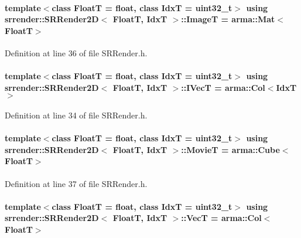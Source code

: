 \paragraph[{\texorpdfstring{ImageT}{ImageT}}]{\setlength{\rightskip}{0pt plus 5cm}template$<$class FloatT  = float, class IdxT  = uint32\+\_\+t$>$ using {\bf srrender\+::\+S\+R\+Render2D}$<$ FloatT, IdxT $>$\+::{\bf ImageT} =  arma\+::\+Mat$<$FloatT$>$}\hypertarget{classsrrender_1_1SRRender2D_a84ba69a439ee39a97bb8fed4eebac011}{}\label{classsrrender_1_1SRRender2D_a84ba69a439ee39a97bb8fed4eebac011}


Definition at line 36 of file S\+R\+Render.\+h.

\paragraph[{\texorpdfstring{I\+VecT}{IVecT}}]{\setlength{\rightskip}{0pt plus 5cm}template$<$class FloatT  = float, class IdxT  = uint32\+\_\+t$>$ using {\bf srrender\+::\+S\+R\+Render2D}$<$ FloatT, IdxT $>$\+::{\bf I\+VecT} =  arma\+::\+Col$<$IdxT$>$}\hypertarget{classsrrender_1_1SRRender2D_abf2e65ab6bcf77af73d3988cc3d457b9}{}\label{classsrrender_1_1SRRender2D_abf2e65ab6bcf77af73d3988cc3d457b9}


Definition at line 34 of file S\+R\+Render.\+h.

\paragraph[{\texorpdfstring{MovieT}{MovieT}}]{\setlength{\rightskip}{0pt plus 5cm}template$<$class FloatT  = float, class IdxT  = uint32\+\_\+t$>$ using {\bf srrender\+::\+S\+R\+Render2D}$<$ FloatT, IdxT $>$\+::{\bf MovieT} =  arma\+::\+Cube$<$FloatT$>$}\hypertarget{classsrrender_1_1SRRender2D_a884febde0e56f7e07fd470f2498eadbd}{}\label{classsrrender_1_1SRRender2D_a884febde0e56f7e07fd470f2498eadbd}


Definition at line 37 of file S\+R\+Render.\+h.

\paragraph[{\texorpdfstring{VecT}{VecT}}]{\setlength{\rightskip}{0pt plus 5cm}template$<$class FloatT  = float, class IdxT  = uint32\+\_\+t$>$ using {\bf srrender\+::\+S\+R\+Render2D}$<$ FloatT, IdxT $>$\+::{\bf VecT} =  arma\+::\+Col$<$FloatT$>$}\hypertarget{classsrrender_1_1SRRender2D_ab2b17bb30a0f86d610ef90e2e8e97e25}{}\label{classsrrender_1_1SRRender2D_ab2b17bb30a0f86d610ef90e2e8e97e25}


